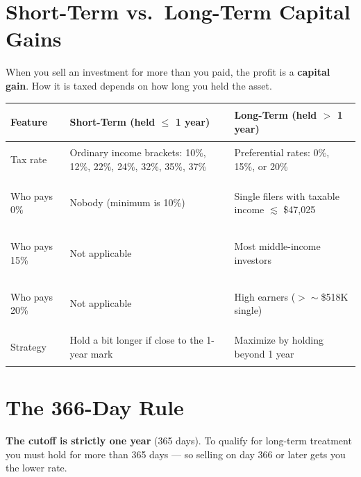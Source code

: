 \documentclass[11pt, letterpaper]{article}
\begin{document}
\section*{Short-Term vs.\ Long-Term Capital Gains}

When you sell an investment for more than you paid, the profit is a \textbf{capital gain}. How it is taxed depends on how long you held the asset.

\noindent
{\renewcommand{\arraystretch}{1.6}
\begin{tabularx}{\textwidth}{>{\bfseries\raggedright\arraybackslash}p{4cm}
                              >{\raggedright\arraybackslash}X
                              >{\raggedright\arraybackslash}X}
\toprule
\rowcolor{tableheaderteal}
\textbf{Feature} & \textbf{Short-Term (held $\leq$ 1 year)} & \textbf{Long-Term (held $>$ 1 year)} \\
\midrule
\rowcolor{rowTe} Tax rate     & Ordinary income brackets: 10\%, 12\%, 22\%, 24\%, 32\%, 35\%, 37\% & Preferential rates: 0\%, 15\%, or 20\% \\
\rowcolor{rowA}  Who pays 0\% & Nobody (minimum is 10\%) & Single filers with taxable income $\lesssim$ \$47{,}025 \\
\rowcolor{rowTe} Who pays 15\%& Not applicable & Most middle-income investors \\
\rowcolor{rowA}  Who pays 20\%& Not applicable & High earners ($>\sim$\$518K single) \\
\rowcolor{rowTe} Strategy     & Hold a bit longer if close to the 1-year mark & Maximize by holding beyond 1 year \\
\bottomrule
\end{tabularx}}

\section*{The 366-Day Rule}

\textbf{The cutoff is strictly one year} (365 days). To qualify for long-term treatment you must hold for more than 365 days --- so selling on day 366 or later gets you the lower rate.
\end{document}
